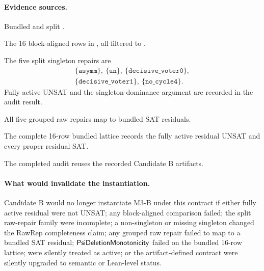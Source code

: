 \paragraph{Evidence sources.}
\begin{description}[style=nextline,leftmargin=2.9cm]
  \item[Fully active UNSAT.]
    Bundled  and split .
  \item[Residual faithfulness.]
    The 16 block-aligned rows in , all filtered to
    .
  \item[RawRep completeness.]
    The five split singleton repairs are
    \[
      \begin{gathered}
      \{\mathtt{asymm}\},\ \{\mathtt{un}\},\
      \{\mathtt{decisive\_voter0}\},\\
      \{\mathtt{decisive\_voter1}\},\
      \{\mathtt{no\_cycle4}\}.
      \end{gathered}
    \]
    Fully active UNSAT and the singleton-dominance argument are recorded in
    the audit result.
  \item[GroupSoundness checks.]
    All five grouped raw repairs map to bundled SAT residuals.
  \item[\(\Psi\)-deletion monotonicity.]
    The complete 16-row bundled lattice records the fully active residual
    UNSAT and every proper residual SAT.
  \item[No new solver run.]
    The completed audit reuses the recorded Candidate B artifacts.
\end{description}

\paragraph{What would invalidate the instantiation.}
Candidate B would no longer instantiate M3-B under this contract if either
fully active residual were not UNSAT; any block-aligned comparison failed; the
split raw-repair family were incomplete; a non-singleton or missing singleton
changed the RawRep completeness claim; any grouped raw repair failed to map to
a bundled SAT residual; \(\mathsf{PsiDeletionMonotonicity}\) failed on the bundled
16-row lattice; \code{no_cycle3} were silently treated as active; or the
artifact-defined contract were silently upgraded to semantic or Lean-level
status.

